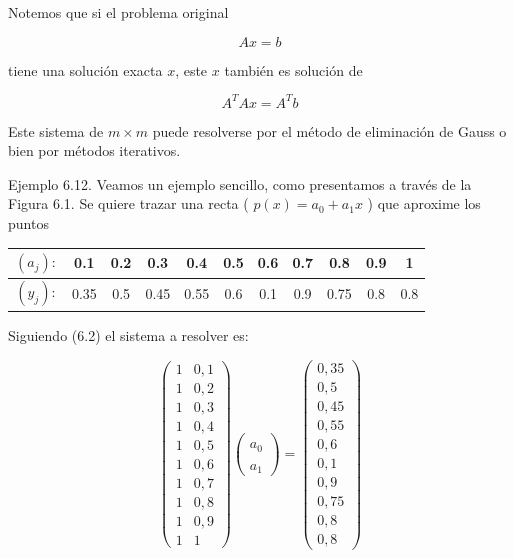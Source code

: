 \documentclass[10pt]{book}
\begin{document}
Notemos que si el problema original

$$
A x=b
$$

tiene una solución exacta $x$, este $x$ también es solución de

$$
A^{T} A x=A^{T} b
$$

Este sistema de $m \times m$ puede resolverse por el método de eliminación de Gauss o bien por métodos iterativos.

Ejemplo 6.12. Veamos un ejemplo sencillo, como presentamos a través de la Figura 6.1. Se quiere trazar una recta ( $p(x)=a_{0}+a_{1} x$ ) que aproxime los puntos

\begin{center}
\begin{tabular}{|c|c|c|c|c|c|c|c|c|c|c|}
\hline
$\left(a_{j}\right):$ & 0.1 & 0.2 & 0.3 & 0.4 & 0.5 & 0.6 & 0.7 & 0.8 & 0.9 & 1 \\
\hline
$\left(y_{j}\right):$ & 0.35 & 0.5 & 0.45 & 0.55 & 0.6 & 0.1 & 0.9 & 0.75 & 0.8 & 0.8 \\
\hline
\end{tabular}
\end{center}

Siguiendo (6.2) el sistema a resolver es:

$$
\left(\begin{array}{cc}
1 & 0,1 \\
1 & 0,2 \\
1 & 0,3 \\
1 & 0,4 \\
1 & 0,5 \\
1 & 0,6 \\
1 & 0,7 \\
1 & 0,8 \\
1 & 0,9 \\
1 & 1
\end{array}\right)\left(\begin{array}{l} 
\\
a_{0} \\
\\
a_{1}
\end{array}\right)=\left(\begin{array}{c}
0,35 \\
0,5 \\
0,45 \\
0,55 \\
0,6 \\
0,1 \\
0,9 \\
0,75 \\
0,8 \\
0,8
\end{array}\right)
$$
\end{document}
